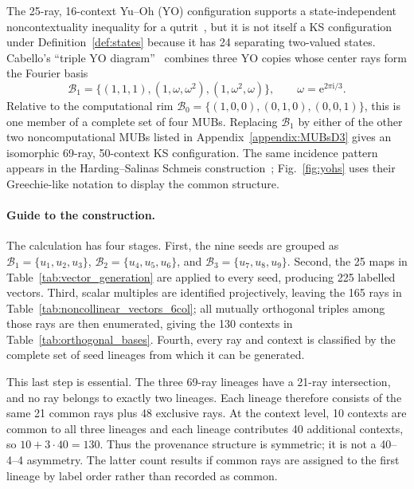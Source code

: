 \documentclass[%
  reprint,
  superscriptaddress,
  showpacs,
  showkeys,
  amsmath,amssymb,
  pra,
  longbibliography,
  floatfix,
  x11names
]{revtex4-2}
\newcommand{\ii}{\mathrm{i}}
\newenvironment{revision}{\begingroup\color{revisionblue}}{\endgroup}
\begin{document}
\begin{revision}
The 25-ray, 16-context Yu--Oh (YO) configuration supports a state-independent noncontextuality inequality for a qutrit~\cite{PhysRevLett.103.050401,Yu-2012,Yu2015}, but it is not itself a KS configuration under Definition~\ref{def:states} because it has 24 separating two-valued states.  Cabello's ``triple YO diagram''~\cite{Cabello2025} combines three YO copies whose center rays form the Fourier basis
\[
\mathcal{B}_1=\{(1,1,1),(1,\omega,\omega^2),(1,\omega^2,\omega)\},
\qquad \omega=\mathrm{e}^{2\pi\ii{}/3}.
\]
Relative to the computational rim $\mathcal{B}_0=\{(1,0,0),(0,1,0),(0,0,1)\}$, this is one member of a complete set of four MUBs.  Replacing $\mathcal{B}_1$ by either of the other two noncomputational MUBs listed in Appendix~\ref{appendix:MUBsD3} gives an isomorphic 69-ray, 50-context KS configuration.  The same incidence pattern appears in the Harding--Salinas Schmeis construction~\cite[Fig.~2 and Theorem~2.6]{harding2025remarksIJTP}; Fig.~\ref{fig:yohs} uses their Greechie-like notation to display the common structure.

\paragraph{Guide to the construction.}
The calculation has four stages.  First, the nine seeds are grouped as $\mathcal{B}_1=\{u_1,u_2,u_3\}$, $\mathcal{B}_2=\{u_4,u_5,u_6\}$, and $\mathcal{B}_3=\{u_7,u_8,u_9\}$.  Second, the 25 maps in Table~\ref{tab:vector_generation} are applied to every seed, producing 225 labelled vectors.  Third, scalar multiples are identified projectively, leaving the 165 rays in Table~\ref{tab:noncollinear_vectors_6col}; all mutually orthogonal triples among those rays are then enumerated, giving the 130 contexts in Table~\ref{tab:orthogonal_bases}.  Fourth, every ray and context is classified by the complete set of seed lineages from which it can be generated.

This last step is essential.  The three 69-ray lineages have a 21-ray intersection, and no ray belongs to exactly two lineages.  Each lineage therefore consists of the same 21 common rays plus 48 exclusive rays.  At the context level, 10 contexts are common to all three lineages and each lineage contributes 40 additional contexts, so $10+3\cdot40=130$.  Thus the provenance structure is symmetric; it is not a 40--4--4 asymmetry.  The latter count results if common rays are assigned to the first lineage by label order rather than recorded as common.


\end{revision}
\end{document}
